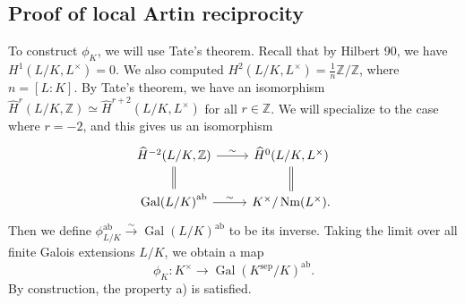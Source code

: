 \documentclass[leqno, openany]{memoir}
\theoremstyle{definition}
\theoremstyle{remark}
\theoremstyle{plain}
\theoremstyle{definition}
\theoremstyle{remark}
\newcommand{\Z}{\mathbb{Z}}
\newcommand{\mr}[1]{\mathrm{#1}}
\newcommand{\wh}[1]{\widehat{#1}}
\DeclareMathOperator{\Gal}{Gal}
\DeclareMathOperator{\Nm}{Nm}
\begin{document}
\subsection{Proof of local Artin reciprocity}%
\label{sub:proof_of_local_artin_reciprocity}

To construct $\phi_K$, we will use Tate's theorem. Recall that by Hilbert 90, we have $H^1(L/K, L^{\times}) = 0$. We also computed $H^2(L/K, L^{\times}) = \frac{1}{n} \Z/\Z$, where $n = [L:K]$. By Tate's theorem, we have an isomorphism $\wh{H}^r(L/K, \Z) \simeq \wh{H}^{r+2}(L/K, L^{\times})$ for all $r \in \Z$. We will specialize to the case where $r = -2$, and this gives us an isomorphism
\begin{equation*}
\begin{tikzcd}
    \wh{H}^{-2}(L/K, \Z) \ar[equal]{d} \ar{r}{\sim} & \wh{H}^0(L/K, L^{\times}) \ar[equal]{d} \\
    {\Gal(L/K)}^{\mr{ab}} \ar{r}{\sim} & K^{\times} / \Nm(L^{\times}).
\end{tikzcd}
\end{equation*}
Then we define $\phi_{L/K}^{\mr{ab}} \xrightarrow{\sim} {\Gal(L/K)}^{\mr{ab}}$ to be its inverse. Taking the limit over all finite Galois extensions $L/K$, we obtain a map
\[ \phi_K \colon K^{\times} \to {\Gal(K^{\mr{sep}}/K)}^{\mr{ab}}. \]
By construction, the property a) is satisfied.
\end{document}
